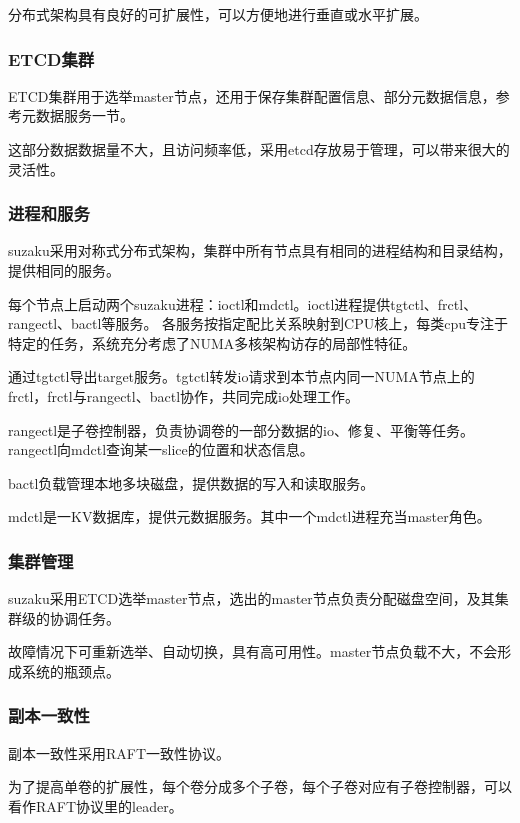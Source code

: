 
分布式架构具有良好的可扩展性，可以方便地进行垂直或水平扩展。

\subsubsection{ETCD集群}

ETCD集群用于选举master节点，还用于保存集群配置信息、部分元数据信息，参考元数据服务一节。

这部分数据数据量不大，且访问频率低，采用etcd存放易于管理，可以带来很大的灵活性。

\subsubsection{进程和服务}

suzaku采用对称式分布式架构，集群中所有节点具有相同的进程结构和目录结构，提供相同的服务。

每个节点上启动两个suzaku进程：ioctl和mdctl。ioctl进程提供tgtctl、frctl、rangectl、bactl等服务。
各服务按指定配比关系映射到CPU核上，每类cpu专注于特定的任务，系统充分考虑了NUMA多核架构访存的局部性特征。

通过tgtctl导出target服务。tgtctl转发io请求到本节点内同一NUMA节点上的frctl，frctl与rangectl、bactl协作，共同完成io处理工作。

rangectl是子卷控制器，负责协调卷的一部分数据的io、修复、平衡等任务。
rangectl向mdctl查询某一slice的位置和状态信息。

bactl负载管理本地多块磁盘，提供数据的写入和读取服务。

mdctl是一KV数据库，提供元数据服务。其中一个mdctl进程充当master角色。

\subsubsection{集群管理}

suzaku采用ETCD选举master节点，选出的master节点负责分配磁盘空间，及其集群级的协调任务。

故障情况下可重新选举、自动切换，具有高可用性。master节点负载不大，不会形成系统的瓶颈点。

\subsubsection{副本一致性}

副本一致性采用RAFT一致性协议。

为了提高单卷的扩展性，每个卷分成多个子卷，每个子卷对应有子卷控制器，可以看作RAFT协议里的leader。

